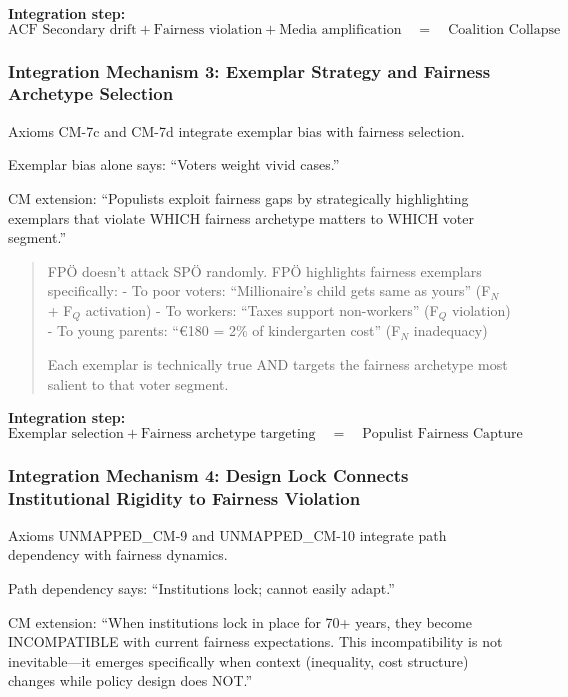 \textbf{Integration step:}
\begin{equation}
\text{ACF Secondary drift} + \text{Fairness violation} + \text{Media amplification} \quad = \quad \text{Coalition Collapse}
\end{equation}

\subsubsection{Integration Mechanism 3: Exemplar Strategy and Fairness Archetype Selection}

Axioms CM-7c and CM-7d integrate exemplar bias with fairness selection.

Exemplar bias alone says: ``Voters weight vivid cases.''

CM extension: ``Populists exploit fairness gaps by strategically highlighting exemplars that
violate WHICH fairness archetype matters to WHICH voter segment.''

\begin{quote}
FPÖ doesn't attack SPÖ randomly. FPÖ highlights fairness exemplars specifically:
- To poor voters: ``Millionaire's child gets same as yours'' (F$_N$ + F$_Q$ activation)
- To workers: ``Taxes support non-workers'' (F$_Q$ violation)
- To young parents: ``€180 = 2\% of kindergarten cost'' (F$_N$ inadequacy)

Each exemplar is technically true AND targets the fairness archetype most salient to that voter segment.
\end{quote}

\textbf{Integration step:}
\begin{equation}
\text{Exemplar selection} + \text{Fairness archetype targeting} \quad = \quad \text{Populist Fairness Capture}
\end{equation}

\subsubsection{Integration Mechanism 4: Design Lock Connects Institutional Rigidity to Fairness Violation}

Axioms UNMAPPED_CM-9 and UNMAPPED_CM-10 integrate path dependency with fairness dynamics.

Path dependency says: ``Institutions lock; cannot easily adapt.''

CM extension: ``When institutions lock in place for 70+ years, they become INCOMPATIBLE with
current fairness expectations. This incompatibility is not inevitable---it emerges specifically
when context (inequality, cost structure) changes while policy design does NOT.''


